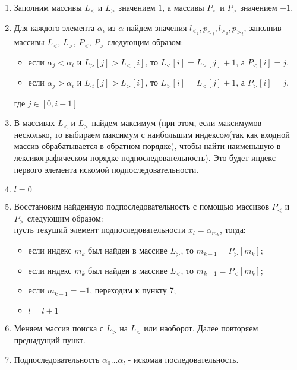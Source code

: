 \documentclass[12pt]{article}
\begin{document}
\begin{enumerate}

\item Заполним массивы $L_<$ и $L_>$ значением $1$, а массивы $P_<$ и $P_>$ значением $-1$.

\item Для каждого элемента $\alpha_i$ из $\alpha$ найдем значения ${l_<}_i,{p_<}_i,{l_>}_i,{p_>}_i$, заполнив массивы $L_<$, $L_>$, $P_<$, $P_>$ следующим образом:

	\begin{itemize}
	
	\item если $ \alpha_j < \alpha_i $ и $ L_>[j] > L_<[i] $, то $ L_<[i] = L_>[j] + 1 $, а $ P_<[i] = j $.

	\item если $ \alpha_j > \alpha_i $ и $ L_<[j] > L_>[i] $, то $ L_>[i] = L_<[j] + 1 $, а $ P_>[i] = j $.
	\end{itemize}
	где $j \in [0, i-1]$	

\item В массивах $ L_< $ и $ L_> $ найдем максимум (при этом, если максимумов несколько, то выбираем максимум с наибольшим индексом(так как входной массив обрабатывается в обратном порядке), чтобы найти наименьшую в лексикографическом порядке подпоследовательность). Это будет индекс первого элемента искомой подпоследовательности.

\item $l = 0$

\item Восстановим найденную подпоследовательность с помощью массивов $P_<$ и $P_>$ следующим образом:\\
пусть текущий элемент подпоследовательности $x_l = \alpha_{m_k}$, тогда:
	\begin{itemize}
	
	\item если индекс ${m_k}$ был найден в массиве $L_>$, то $m_{k-1} = P_>[m_k]$;

	\item если индекс ${m_k}$ был найден в массиве $L_<$, то $m_{k-1} = P_<[m_k]$;
	
	\item если $m_{k-1} = -1$, переходим к пункту 7;
	
	\item $l = l + 1$
	
	\end{itemize}
	
\item Меняем массив поиска с $L_>$ на $L_<$ или наоборот. Далее повторяем предыдущий пункт.
	
\item Подпоследовательность $\alpha_0\dots\alpha_l$ - искомая последовательность.
	
\end{enumerate}
	
\end{document}
